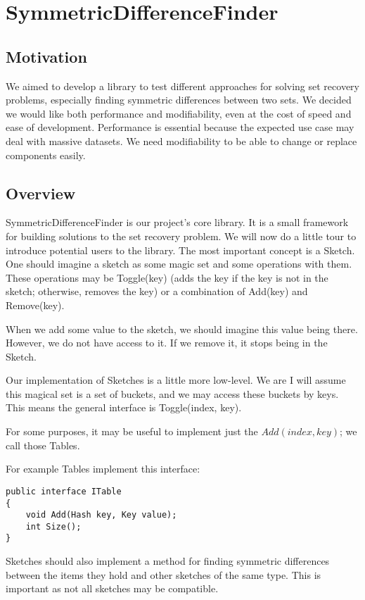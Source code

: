 \chapter{SymmetricDifferenceFinder}

\section{Motivation}
We aimed to develop a library to test different approaches for solving set recovery problems, especially finding symmetric differences between two sets. We decided we would like both performance and modifiability, even at the cost of speed and ease of development. Performance is essential because the expected use case may deal with massive datasets. We need modifiability to be able to change or replace components easily.

\section{Overview}
SymmetricDifferenceFinder is our project's core library. It is a small framework for building solutions to the set recovery problem. 
We will now do a little tour to introduce potential users to the library. The most important concept is a Sketch. One should imagine a sketch as some magic set and some operations with them. These operations may be Toggle(key) (adds the key if the key is not in the sketch; otherwise, removes the key) or a combination of Add(key) and Remove(key). 

When we add some value to the sketch, we should imagine this value being there. However, we do not have access to it. If we remove it, it stops being 
in the Sketch. 

Our implementation of Sketches is a little more low-level. We are 
I will assume this magical set is a set of buckets, and we may access these buckets by keys. This means the general interface is Toggle(index, key).

For some purposes, it may be useful to implement just the $Add(index, key)$; we call those Tables.

For example Tables implement this interface:
\begin{lstlisting}
public interface ITable
{
    void Add(Hash key, Key value);
    int Size();
}
\end{lstlisting}

Sketches should also implement a method for finding symmetric differences between the items they hold and other sketches of the same type. This is important as not all sketches may be compatible.

